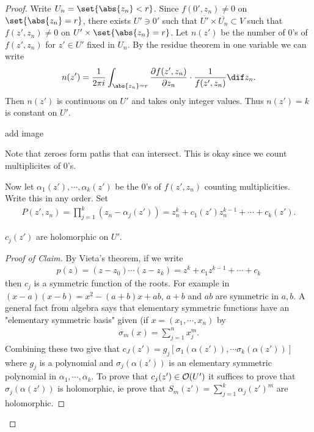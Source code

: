 \begin{proof}
    Write $U_n = \set{\abs{z_n} < r}$. Since $f(0',z_n) \neq 0$ on $\set{ \abs{z_n} = r}$, there exists $U' \ni 0'$ such that $\overline{U'} \times \overline{U_n} \subset V$ such that $f(z', z_n) \neq 0$ on $U' \times \set{\abs{z_n } = r}$. Let $n(z')$ be the number of $0$'s of $f(z',z_n) $ for $z' \in U'$ fixed in $U_n$. By the residue theorem in one variable we can write
    \begin{align*}
        n(z') = \frac{1}{2 \pi i} \int_{\abs{z_n} =r} \frac{\partial f(z', z_n)}{\partial z_n} \cdot \frac{1}{f(z',z_n)} \dif z_n.
    \end{align*}
    Then $n(z')$ is continuous on $U'$ and takes only integer values. Thus $n(z') = k$ is constant on $U'$.

    add image

    Note that zeroes form paths that can intersect. This is okay since we count multiplicites of $0$'s.

    Now let $\alpha_1 (z') , \cdots, \alpha_k (z')$ be the $0$'s of $f(z',z_n)$ counting multiplicities. Write this in any order. Set
    \begin{align*}
        P(z',z_n) = \prod_{j=1}^k (z_n - \alpha_j (z')) = z_n^k + c_1(z')z_n^{k-1} + \cdots + c_k (z').
    \end{align*}

\begin{claim}
    $c_j(z')$ are holomorphic on $U'$.
\end{claim}
\begin{proof}[Proof of Claim]
    By Vieta's theorem, if we write
    \begin{align*}
        p(z) = (z- z_0) \cdots (z-z_k) = z^k + c_1 z^{k-1} + \cdots + c_k
    \end{align*}
    then $c_j$ is a symmetric function of the roots. For example in $(x-a)(x-b) = x^2 - (a+b ) x + ab$, $a+b $ and $ab$ are symmetric in $a,b$. A general fact from algebra says that elementary symmetric functions have an "elementary symmetric basis" given (if $x = (x_1, \cdots, x_n)$ by
    \begin{align*}
        \sigma_m(x) = \sum_{j=1}^n x_j^m.
    \end{align*}
    Combining these two give that $c_J(z') = g_j\left[ \sigma_1 (\alpha (z') ) , \cdots \sigma_k (\alpha (z') ) \right]$ where $g_j $ is a polynomial and $\sigma_j (\alpha (z') )$ is an elementary symmetric polynomial in $\alpha_1 , \cdots, \alpha_k$. To prove that $c_j(z') \in \mathcal{O}(U')$ it suffices to prove that $\sigma_j (\alpha(z'))$ is holomorphic, ie prove that $S_m(z') = \sum_{j=1}^k \alpha_j (z')^m$ are holomorphic.


\end{proof}
\end{proof}
